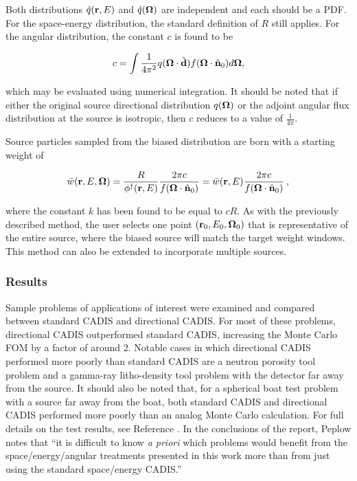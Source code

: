 Both distributions $\hat{q}(\textbf{r},E)$ and $\hat{q}(\mathbf\Omega)$ are independent and each 
should be a PDF. For the space-energy distribution, the standard definition of $R$
still applies. For the angular distribution, the constant $c$ is found to be

\begin{equation}
c = \int\frac{1}{4\pi^2}q(\mathbf\Omega\cdot\hat{\mathbf{d}})f(\mathbf\Omega\cdot\hat{\mathbf{n}}_0)d\mathbf\Omega,
\end{equation}

\noindent which may be evaluated using numerical integration. It should be noted that
if either the original source directional distribution $q(\mathbf\Omega)$ or the adjoint
angular flux distribution at the source is isotropic, then $c$ reduces to a value of
$\frac{1}{4\pi}$.

Source particles sampled from the biased distribution are born with a starting weight
of

\begin{equation}
\bar{w}(\textbf{r},E,\mathbf\Omega) =
\frac{R}{\phi^{\dagger}(\textbf{r},E)}\frac{2\pi c}{f(\mathbf\Omega\cdot\hat{\mathbf{n}}_0)} = 
\bar{w}(\textbf{r},E)\frac{2\pi c}{f(\mathbf\Omega\cdot\hat{\mathbf{n}}_0)}\:,
\end{equation}

\noindent where the constant $k$ has been found to be equal to $cR$. As with the 
previously described method, the user selects one point $(\textbf{r}_0,E_0,\mathbf\Omega_0)$ that is
representative of the entire source, where the biased source will match the target
weight windows. This method can also be extended to incorporate multiple sources.

\subsubsection{Results}

Sample problems of applications of interest were examined and compared between 
standard CADIS and directional CADIS. For most of these problems, directional CADIS 
outperformed standard CADIS, increasing the Monte Carlo FOM by a factor of around 2. Notable
cases in which directional CADIS performed more poorly than standard CADIS are a
neutron porosity tool problem and a gamma-ray litho-density tool problem with the
detector far away from the source. It should also be noted that, for a spherical boat
test problem with a source far away from the boat, both standard CADIS and directional
CADIS performed more poorly than an analog Monte Carlo calculation. For full details on the
test results, see Reference \cite{peplow}. In the conclusions of the report, Peplow 
notes that ``it is difficult to know \textit{a priori} which problems would benefit 
from the space/energy/angular treatments presented in this work more than from just 
using the standard space/energy CADIS.''

